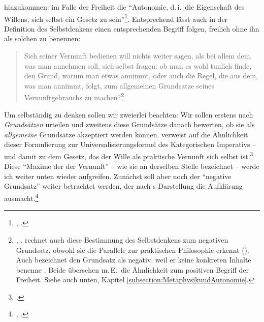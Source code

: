 hinzukommen: im Falle der Freiheit die \enquote{Autonomie, d.\,i.\ die
Eigenschaft des Willens, sich selbst ein Gesetz zu
sein}\footnote{\cite[][BA~98]{Kant:GrundlegungzurMetaphysikderSitten1965},
\cite[][IV: 447.1--2]{Kant:GesammelteWerke1900ff.}.}. Entsprechend lässt
 auch in der Definition des Selbstdenkens einen entsprechenden
\label{positiverBegriffdesSelbstdenkens}
Begriff folgen, freilich ohne ihn als solchen zu benennen:
\begin{quote}
  Sich seiner  Vernunft bedienen will nichts weiter sagen, als bei
  allem dem, was man annehmen soll, sich selbst fragen: ob man es wohl tunlich
  finde, den Grund, warum man etwas annimmt, oder auch die Regel, die aus dem,
  was man annimmt, folgt, zum allgemeinen Grundsatze seines Vernunftgebrauchs zu
  machen?\footnote{\label{Fussnote:positiverBegriffdesSelbstdenkens}\cite[A~329]{Kant:Washeisst:SichimDenkenorientieren?1977},
  \cite[VIII: 146.35--147.6]{Kant:GesammelteWerke1900ff.}.
   rechnet auch diese Bestimmung
  des Selbstdenkens zum negativen Grundsatz, obwohl sie die Parallele zur
  praktischen Philosophie erkennt
  (\cite[vgl.][218]{ONeill:AufgeklaerteVernunft1996}). Auch
  bezeichnet den Grundsatz als negativ, weil er keine konkreten Inhalte benenne
  \parencite[vgl.][146]{Deligiorgi:UniversalisabilityPublicitaandCommunication2002}.
  Beide übersehen m.\,E.\ die Ähnlichkeit zum positiven Begriff der Freiheit.
  Siehe auch unten, Kapitel \ref{subsection:MetaphysikundAutonomie}.}
\end{quote}
Um selbständig zu denken sollen wir zweierlei beachten: Wir sollen erstens nach
\emph{Grundsätzen} urteilen und zweitens diese Grundsätze danach bewerten, ob sie als
\emph{allgemeine} Grundsätze akzeptiert werden können.
 verweist auf die
Ähnlichkeit dieser Formulierung zur Universalisierungsformel des Kategorischen Imperativs --
und damit zu dem Gesetz, das der Wille als praktische Vernunft sich selbst
ist.\footnote{\cite[Vgl.][330]{Cohen:KantontheEthicsofBelief2014}.} Diese \enquote{Maxime
der  der Vernunft} -- wie  sie an
derselben Stelle bezeichnet -- werde ich weiter unten wieder aufgreifen.
Zunächst soll aber noch der \enquote{negative Grundsatz} weiter betrachtet
werden, der nach s Darstellung die Aufklärung
ausmacht.\footnote{\cite[Vgl.][\S~40]{Kant:KritikderUrteilskraft2009},
\cite[][V: 294.35--36]{Kant:GesammelteWerke1900ff.}.}

